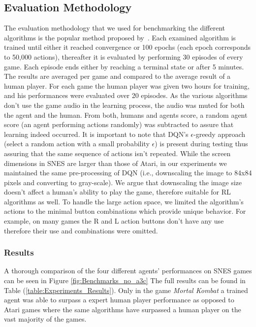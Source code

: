 \documentclass{article}
\begin{document}
\subsection{Evaluation Methodology}
The evaluation methodology that we used for benchmarking the different algorithms is the popular method proposed by~\citep{mnih2015human}. Each examined algorithm is trained until either it reached convergence or 100 epochs (each epoch corresponds to 50,000 actions), thereafter it is evaluated by performing 30 episodes of every game. 
Each episode ends either by reaching a terminal state or after 5 minutes. 
The results are averaged per game and compared to the average result of a human player. 
For each game the human player was given two hours for training, and his performances were evaluated over 20 episodes. 
As the various algorithms don't use the game audio in the learning process, the audio was muted for both the agent and the human. 
From both, humans and agents score, a random agent score (an agent performing actions randomly) was subtracted to assure that learning indeed occurred. It is important to note that DQN's $\epsilon$-greedy approach (select a random action with a small probability $\epsilon$) is present during testing thus assuring that the same sequence of actions isn't repeated.
While the screen dimensions in SNES are larger than those of Atari, in our experiments we maintained the same pre-processing of DQN (i.e., downscaling the image to 84x84 pixels and converting to gray-scale).
We argue that downscaling the image size doesn't affect a human's ability to play the game, therefore suitable for RL algorithms as well. 
To handle the large action space, we limited the algorithm's actions to the minimal button combinations which provide unique behavior. For example, on many games the R and L action buttons don't have any use therefore their use and combinations were omitted.

\subsubsection{Results}
A thorough comparison of the four different agents' performances on SNES games can be seen in Figure
\ref{fig:Benchmarks_no_a3c}
The full results can be found in Table (\ref{table:Experiments_Results}).
Only in the game \textit{Mortal Kombat} a trained agent was able to surpass a expert human player performance as opposed to Atari games where the same algorithms have surpassed a human player on the vast majority of the games.
\end{document}
